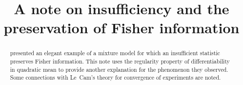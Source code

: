 \documentclass[aos]{imsart}
\begin{document}
\begin{frontmatter}
\title{A note on insufficiency and the preservation of Fisher information}

\begin{aug}
\author{
}



\address{Statistics Department\\
Yale University\\
New Haven, Connecticut\\
}

\end{aug}

\begin{abstract}
\citet{KaganShepp05AmStat} presented an elegant example of a mixture model  for which an insufficient statistic  preserves Fisher information.
This note uses the regularity property of differentiability in quadratic mean to provide another explanation for the phenomenon they observed. Some connections with Le~Cam's theory for convergence of experiments are noted. 
\end{abstract}

\begin{keyword}[class=AMS]
\end{keyword}

\begin{keyword}
\end{keyword}

\end{frontmatter}
\end{document}
